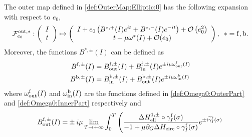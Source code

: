 
\begin{lemma}\label{lemma:Outer:Elliptic}
  The outer map defined in \eqref{def:OuterMap:Elliptic:0} has the following expansion with respect to $e_0$,
  \begin{equation}\label{def:OuterMap:Elliptic}
    \mathcal{F}_{e_0}^{\mathrm{out},\ast}:\left(\begin{array}{c} I\\
        t
      \end{array}\right)\mapsto \left(\begin{array}{c} I+ e_0\left(B^{\ast,+} (I)e^{it}+B^{\ast,-} (I)e^{-it}\right) +\mathcal{O}\left(e_0^2\right)\\
        t+\mu\omega^{\ast}(I)+\mathcal{O}(e_0)
      \end{array}\right),\,\,\,\ast=\mathrm{f},\mathrm{b}.
  \end{equation}
  Moreover, the functions $B^{\ast,\pm}(I)$ can be defined as
\begin{equation}\label{def:Omega:PlusMinus}
\begin{split}
B^{\mathrm{f},\pm}(I)&=B_{\mathrm{out}}^{\mathrm{f},\pm}(I)+B_{\mathrm{in}}^{\mathrm{f},\pm}(I)e^{\pm i\mu\omega_{\mathrm{out}}^{\mathrm{f}}(I)}\\
B^{\mathrm{b},\pm}(I)&=B_{\mathrm{in}}^{\mathrm{b},\pm}(I)+B_{\mathrm{out}}^{\mathrm{b},\pm}(I)e^{\pm i\mu\omega_{\mathrm{in}}^{\mathrm{b}}(I)}
\end{split}
\end{equation}
where $\omega_{\mathrm{out}}^{\mathrm{f}}(I)$ and $\omega_{\mathrm{in}}^{\mathrm{b}}(I)$ are the functions defined in \eqref{def:Omega0:OuterPart} and \eqref{def:Omega0:InnerPart} respectively and
  \begin{align}\label{def:Omega:PlusMinus:Out:for}
    B^{\ff,\pm}_\out(I)=&\pm i\mu\lim_{T\rightarrow+\infty}\int_0^T\left(\frac{\Delta H^{1,\pm}_\eell\circ\gamma_I^\ff(\sigma)}{-1+\mu\pa_G\Delta H_\ccirc\circ\gamma_I^\ff(\sigma)}e^{\pm i\wt\gamma_I^\ff(\sigma)}\right.\\

\end{align}
\end{lemma}
